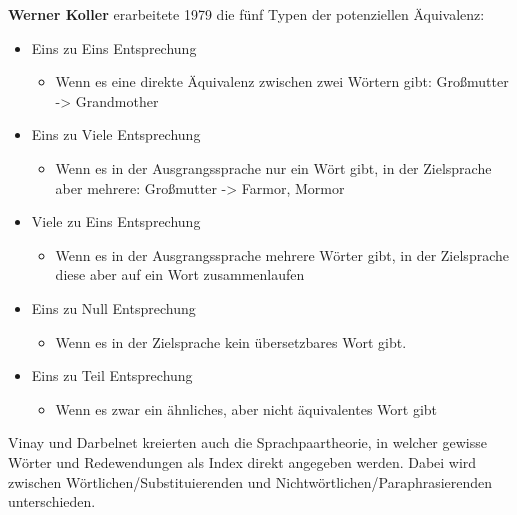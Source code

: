 \documentclass{article}
\begin{document}
	\textbf{Werner Koller} erarbeitete 1979 die fünf Typen der potenziellen Äquivalenz:
	\begin{itemize}
		\item{Eins zu Eins Entsprechung}
		\begin{itemize}
			\item{Wenn es eine direkte Äquivalenz zwischen zwei Wörtern gibt: Großmutter -> Grandmother}
		\end{itemize}
		\item{Eins zu Viele Entsprechung}
		\begin{itemize}
			\item{Wenn es in der Ausgrangssprache nur ein Wört gibt, in der Zielsprache aber mehrere: Großmutter -> Farmor, Mormor}
		\end{itemize}
		\item{Viele zu Eins Entsprechung}
		\begin{itemize}
			\item{Wenn es in der Ausgrangssprache mehrere Wörter gibt, in der Zielsprache diese aber auf ein Wort zusammenlaufen}
		\end{itemize}
		\item{Eins zu Null Entsprechung}
		\begin{itemize}
			\item{Wenn es in der Zielsprache kein übersetzbares Wort gibt.}
		\end{itemize}
		\item{Eins zu Teil Entsprechung}
		\begin{itemize}
			\item{Wenn es zwar ein ähnliches, aber nicht äquivalentes Wort gibt}
		\end{itemize}
	\end{itemize}
	Vinay und Darbelnet kreierten auch die Sprachpaartheorie, in welcher gewisse Wörter und Redewendungen als Index direkt angegeben werden. Dabei wird zwischen Wörtlichen/Substituierenden und Nichtwörtlichen/Paraphrasierenden unterschieden. \\
\end{document}
